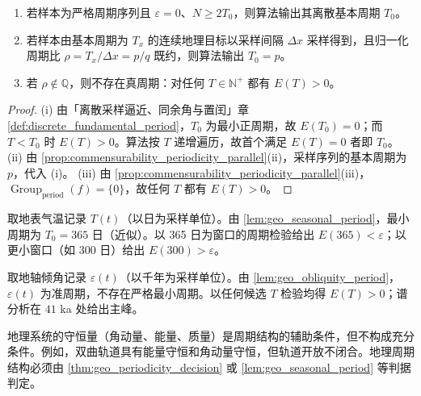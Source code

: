 \begin{theorem}[地理最小正周期算法的正确性]\label{thm:geo_minimal_period_correctness}
\begin{enumerate}[label=(\roman*)]
    \item 若样本为严格周期序列且 $\varepsilon=0$、$N\ge2T_0$，则算法输出其离散基本周期 $T_0$。
    \item 若样本由基本周期为 $T_x$ 的连续地理目标以采样间隔 $\Delta x$ 采样得到，且归一化周期比 $\rho=T_x/\Delta x=p/q$ 既约，则算法输出 $T_0=p$。
    \item 若 $\rho\notin\mathbb Q$，则不存在真周期：对任何 $T\in\mathbb N^+$ 都有 $E(T)>0$。
\end{enumerate}
\end{theorem}

\begin{proof}
(i) 由「离散采样逼近、同余角与置闰」章 \cref{def:discrete_fundamental_period}，$T_0$ 为最小正周期，故 $E(T_0)=0$；而 $T<T_0$ 时 $E(T)>0$。算法按 $T$ 递增遍历，故首个满足 $E(T)=0$ 者即 $T_0$。
(ii) 由 \cref{prop:commensurability_periodicity_parallel}(ii)，采样序列的基本周期为 $p$，代入 (i)。
(iii) 由 \cref{prop:commensurability_periodicity_parallel}(iii)，$\operatorname{Group}_{\mathrm{period}}(f)=\{0\}$，故任何 $T$ 都有 $E(T)>0$。
\end{proof}

\begin{example}[季节循环的周期判定实例]\label{ex:geo_seasonal_period}
取地表气温记录 $T(t)$（以日为采样单位）。由 \cref{lem:geo_seasonal_period}，最小周期为 $T_0=365$ 日（近似）。以 365 日为窗口的周期检验给出 $E(365)<\varepsilon$；以更小窗口（如 300 日）给出 $E(300)>\varepsilon$。
\end{example}

\begin{example}[米兰科维奇旋回的准周期判定]\label{ex:geo_milankovitch_quasi}
取地轴倾角记录 $\varepsilon(t)$（以千年为采样单位）。由 \cref{lem:geo_obliquity_period}，$\varepsilon(t)$ 为准周期，不存在严格最小周期。以任何候选 $T$ 检验均得 $E(T)>0$；谱分析在 $41$ ka 处给出主峰。
\end{example}

\begin{remark}[守恒量不保证周期]\label{rem:geo_invariant_not_period}
地理系统的守恒量（角动量、能量、质量）是周期结构的辅助条件，但不构成充分条件。例如，双曲轨道具有能量守恒和角动量守恒，但轨道开放不闭合。地理周期结构必须由 \cref{thm:geo_periodicity_decision} 或 \cref{lem:geo_seasonal_period} 等判据判定。
\end{remark}

